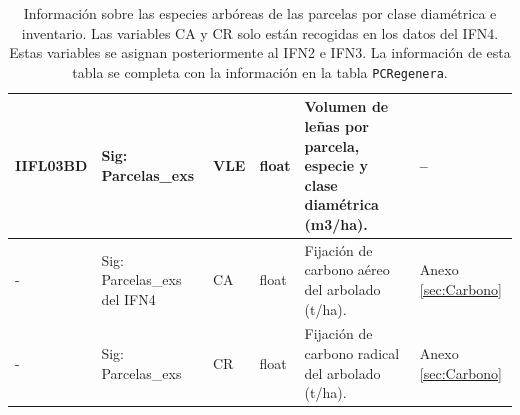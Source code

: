 \begin{table}[H]
{\begin{tabular}{|>{\centering\arraybackslash}m{1.5cm}|>{\centering\arraybackslash}m{3.5cm}|>{\centering\arraybackslash}m{3.5cm}|>{\centering\arraybackslash}m{2cm}|m{5cm}|>{\centering\arraybackslash}m{2cm}|}
\hline
IIFL03BD & Sig: Parcelas\_exs & VLE & float & Volumen de leñas por parcela, especie y clase diamétrica (m3/ha). & -- \\
\hline
- & Sig: Parcelas\_exs del IFN4 & CA & float & Fijación de carbono aéreo del arbolado (t/ha). & Anexo \ref{sec:Carbono} \\
\hline
- & Sig: Parcelas\_exs & CR & float & Fijación de carbono radical del arbolado (t/ha). & Anexo \ref{sec:Carbono} \\
\hline
\end{tabular}%
}
\caption{Información sobre las especies arbóreas de las parcelas por clase diamétrica e inventario. Las variables CA y CR solo están recogidas en los datos del IFN4. Estas variables se asignan posteriormente al IFN2 e IFN3. La información de esta tabla se completa con la información en la tabla \texttt{PCRegenera}.}
\label{tab:parcela_inventario_especie_cd}
\end{table}




